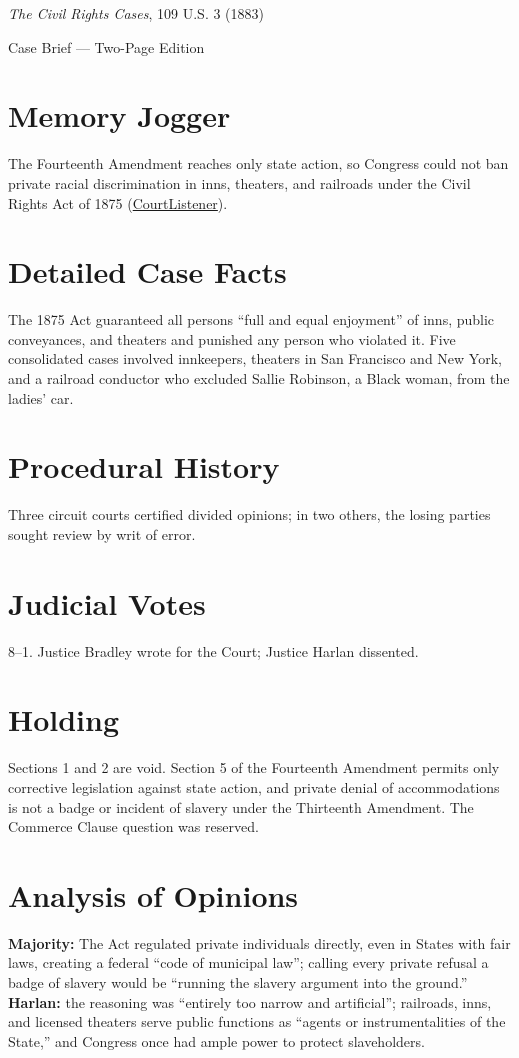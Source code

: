 \documentclass[12pt]{article}
\begin{document}
\begin{center}
{\LARGE \textit{The Civil Rights Cases}, 109 U.S. 3 (1883)\par}
\vspace{0.5em}
{\large Case Brief --- Two-Page Edition\par}
\end{center}

\section{Memory Jogger}
The Fourteenth Amendment reaches only state action, so Congress could not ban private racial discrimination in inns, theaters, and railroads under the Civil Rights Act of 1875 (\href{https://www.courtlistener.com/opinion/90897/civil-rights-cases/}{CourtListener}).

\section{Detailed Case Facts}
The 1875 Act guaranteed all persons ``full and equal enjoyment'' of inns, public conveyances, and theaters and punished any person who violated it. Five consolidated cases involved innkeepers, theaters in San Francisco and New York, and a railroad conductor who excluded Sallie Robinson, a Black woman, from the ladies' car.

\section{Procedural History}
Three circuit courts certified divided opinions; in two others, the losing parties sought review by writ of error.

\section{Judicial Votes}
8--1. Justice Bradley wrote for the Court; Justice Harlan dissented.

\section{Holding}
Sections 1 and 2 are void. Section 5 of the Fourteenth Amendment permits only corrective legislation against state action, and private denial of accommodations is not a badge or incident of slavery under the Thirteenth Amendment. The Commerce Clause question was reserved.

\section{Analysis of Opinions}
\textbf{Majority:} The Act regulated private individuals directly, even in States with fair laws, creating a federal ``code of municipal law''; calling every private refusal a badge of slavery would be ``running the slavery argument into the ground.'' \textbf{Harlan:} the reasoning was ``entirely too narrow and artificial''; railroads, inns, and licensed theaters serve public functions as ``agents or instrumentalities of the State,'' and Congress once had ample power to protect slaveholders.
\end{document}
